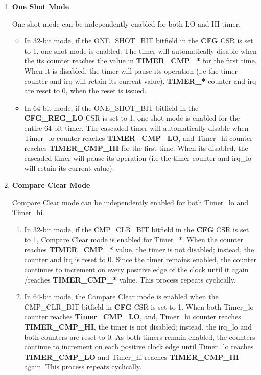 \begin{enumerate}
  \item \textbf{One Shot Mode} 
  
  One-shot mode can be independently enabled for both LO and HI timer.
    \begin{itemize}
      \item In 32-bit mode, if the ONE\_SHOT\_BIT bitfield in the \textbf{CFG} CSR is set to 1, one-shot mode is enabled. The timer will automatically disable when the its counter reaches the value in \textbf{TIMER\_CMP\_*} for the first time. When it is disabled, the timer will pause its operation (i.e the timer counter and irq will retain its current value). \textbf{TIMER\_*} counter and irq are reset to 0, when the reset is issued.
      \item In 64-bit mode, if the ONE\_SHOT\_BIT bitfield in the \textbf{CFG\_REG\_LO} CSR is set to 1, one-shot mode is enabled for the entire 64-bit timer. The cascaded timer will automatically disable when Timer\_lo counter reaches \textbf{TIMER\_CMP\_LO}, and Timer\_hi counter reaches \textbf{TIMER\_CMP\_HI} for the first time. When its disabled, the cascaded timer will pause its operation (i.e the timer counter and irq\_lo will retain its current value).
    \end{itemize}  
  \item \textbf{Compare Clear Mode}
  
  Compare Clear mode can be independently enabled for both Timer\_lo and Timer\_hi.
    \begin{enumerate}
      \item In 32-bit mode, if the CMP\_CLR\_BIT bitfield in the \textbf{CFG} CSR is set to 1, Compare Clear mode is enabled for Timer\_*. When the counter reaches \textbf{TIMER\_CMP\_*} value, the timer is not disabled; instead, the counter and irq is reset to 0. Since the timer remains enabled, the counter continues to increment on every positive edge of the clock until it again /reaches \textbf{TIMER\_CMP\_*} value. This process repeats cyclically.
      \item In 64-bit mode, the Compare Clear mode is enabled when the CMP\_CLR\_BIT bitfield in \textbf{CFG} CSR is set to 1. When both Timer\_lo counter reaches \textbf{Timer\_CMP\_LO}, and, Timer\_hi counter reaches \textbf{TIMER\_CMP\_HI}, the timer is not disabled; instead, the irq\_lo and both counters are reset to 0. As both timers remain enabled, the counters continue to increment on each positive clock edge until Timer\_lo reaches \textbf{TIMER\_CMP\_LO} and Timer\_hi reaches \textbf{TIMER\_CMP\_HI} again. This process repeats cyclically.
    \end{enumerate}
\end{enumerate}

